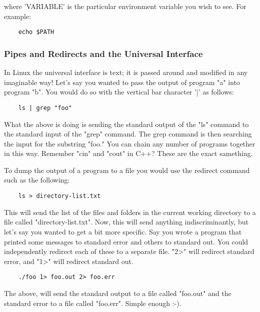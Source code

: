 \mdseries \noindent where 'VARIABLE' is the particular environment variable you wish to see.  For example:

	\begin{lstlisting}
	echo $PATH
	\end{lstlisting}


\subsubsection{Pipes and Redirects and the Universal Interface} \mdseries 
\mdseries \noindent In Linux the universal interface is text; it is passed around and modified in any imaginable way!  Let's say you wanted to pass the output of program "a" into program "b".  You would do so with the vertical bar character '|' as follows:
	
	\begin{lstlisting}
	ls | grep "foo"
	\end{lstlisting}
	
\mdseries \noindent What the above is doing is sending the standard output of the "ls" command to the standard input of the "grep" command.  The grep command is then searching the input for the substring "foo."  You can chain any number of programs together in this way.  Remember "cin" and "cout" in C++? These are the exact samething.

\mdseries \noindent To dump the output of a program to a file you would use the redirect command such as the following:

	\begin{lstlisting}
	ls > directory-list.txt
	\end{lstlisting}
	
\mdseries \noindent This will send the list of the files and folders in the current working directory to a file called "directory-list.txt".  Now, this will send anything indiscriminantly, but let's say you wanted to get a bit more specific.  Say you wrote a program that printed some messages to standard error and others to standard out.  You could independently redirect each of these to a separate file.  "2>" will redirect standard error, and "1>" will redirect standard out.

	\begin{lstlisting}
	./foo 1> foo.out 2> foo.err
	\end{lstlisting}
	
The above, will send the standard output to a file called "foo.out" and the standard error to a file called "foo.err".  Simple enough :-).

